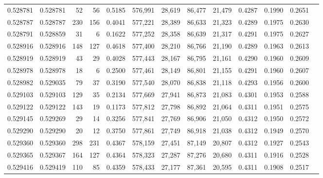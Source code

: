 \begin{tabular}{rrrrrrrrrrrrr}
0.528781 & 0.528781 &    52 &    56 &                                     0.5185 & 576,991 &  28,619 &  86,477 &  21,479 & 0.4287 & 0.1990 & 0.2651 \\
0.528787 & 0.528787 &   230 &   156 &                                     0.4041 & 577,221 &  28,389 &  86,633 &  21,323 & 0.4289 & 0.1975 & 0.2630 \\
0.528791 & 0.528859 &    31 &     6 &                                     0.1622 & 577,252 &  28,358 &  86,639 &  21,317 & 0.4291 & 0.1975 & 0.2627 \\
0.528916 & 0.528916 &   148 &   127 &                                     0.4618 & 577,400 &  28,210 &  86,766 &  21,190 & 0.4289 & 0.1963 & 0.2613 \\
0.528919 & 0.528919 &    43 &    29 &                                     0.4028 & 577,443 &  28,167 &  86,795 &  21,161 & 0.4290 & 0.1960 & 0.2609 \\
0.528978 & 0.528978 &    18 &     6 &                                     0.2500 & 577,461 &  28,149 &  86,801 &  21,155 & 0.4291 & 0.1960 & 0.2607 \\
0.528982 & 0.529035 &    79 &    37 &                                     0.3190 & 577,540 &  28,070 &  86,838 &  21,118 & 0.4293 & 0.1956 & 0.2600 \\
0.529103 & 0.529103 &   129 &    35 &                                     0.2134 & 577,669 &  27,941 &  86,873 &  21,083 & 0.4301 & 0.1953 & 0.2588 \\
0.529122 & 0.529122 &   143 &    19 &                                     0.1173 & 577,812 &  27,798 &  86,892 &  21,064 & 0.4311 & 0.1951 & 0.2575 \\
0.529145 & 0.529269 &    29 &    14 &                                     0.3256 & 577,841 &  27,769 &  86,906 &  21,050 & 0.4312 & 0.1950 & 0.2572 \\
0.529290 & 0.529290 &    20 &    12 &                                     0.3750 & 577,861 &  27,749 &  86,918 &  21,038 & 0.4312 & 0.1949 & 0.2570 \\
0.529360 & 0.529360 &   298 &   231 &                                     0.4367 & 578,159 &  27,451 &  87,149 &  20,807 & 0.4312 & 0.1927 & 0.2543 \\
0.529365 & 0.529367 &   164 &   127 &                                     0.4364 & 578,323 &  27,287 &  87,276 &  20,680 & 0.4311 & 0.1916 & 0.2528 \\
0.529416 & 0.529419 &   110 &    85 &                                     0.4359 & 578,433 &  27,177 &  87,361 &  20,595 & 0.4311 & 0.1908 & 0.2517 \\

\end{tabular}
